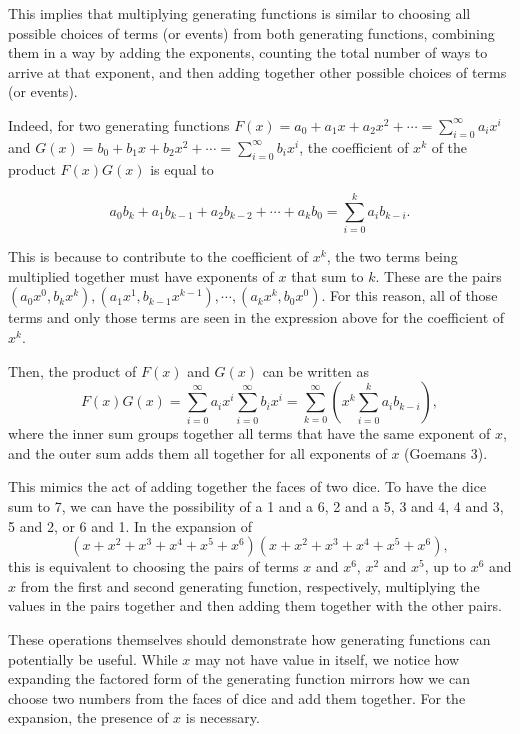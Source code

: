\documentclass[12pt]{article}
\begin{document}
This implies that multiplying generating functions is similar to choosing all possible choices of terms (or events) from both generating functions, combining them in a way by adding the exponents, counting the total number of ways to arrive at that exponent, and then adding together other possible choices of terms (or events).
\begin{sloppypar}Indeed, for two generating functions $F(x)=a_0 +a_1 x + a_2 x^2 + \cdots=\sum_{i=0}^\infty a_i x^i$ and ${G(x)=b_0 + b_1 x + b_2 x^2 + \cdots=\sum_{i=0}^\infty b_i x^i}$, the coefficient of $x^k$ of the product $F(x)G(x)$ is equal to \end{sloppypar}\[a_0 b_k + a_1 b_{k-1} + a_2 b_{k-2} + \cdots + a_k b_0 = \sum_{i=0}^k a_i b_{k-i}.\] \begin{sloppypar}This is because to contribute to the coefficient of $x^k$, the two terms being multiplied together must have exponents of $x$ that sum to $k$. These are the pairs ${(a_0 x^0, b_k x^k), (a_1 x^1, b_{k-1} x^{k-1}), \cdots, (a_k x^k, b_{0} x^{0})}$. For this reason, all of those terms and only those terms are seen in the expression above for the coefficient of $x^k$.\end{sloppypar}

Then, the product of $F(x)$ and $G(x)$ can be written as \begin{equation}\label{multiplication operation}F(x)G(x)=\sum_{i=0}^\infty a_i x^i\sum_{i=0}^\infty b_i x^i=\sum_{k=0}^\infty \left(x^k\sum_{i=0}^k a_i b_{k-i}\right),\end{equation} where the inner sum groups together all terms that have the same exponent of $x$, and the outer sum adds them all together for all exponents of $x$ (Goemans 3).

This mimics the act of adding together the faces of two dice. To have the dice sum to 7, we can have the possibility of a 1 and a 6, 2 and a 5, 3 and 4, 4 and 3, 5 and 2, or 6 and 1. In the expansion of \[(x+x^2+x^3+x^4+x^5+x^6)(x+x^2+x^3+x^4+x^5+x^6),\] this is equivalent to choosing the pairs of terms $x$ and $x^6$, $x^2$ and $x^5$, up to $x^6$ and $x$ from the first and second generating function, respectively, multiplying the values in the pairs together and then adding them together with the other pairs.

These operations themselves should demonstrate how generating functions can potentially be useful. While $x$ may not have value in itself, we notice how expanding the factored form of the generating function mirrors how we can choose two numbers from the faces of dice and add them together. For the expansion, the presence of $x$ is necessary.
\end{document}

